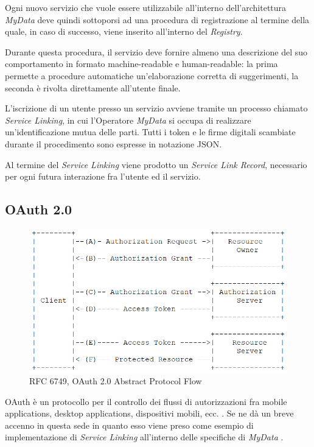 Ogni nuovo servizio che vuole essere utilizzabile all’interno dell’architettura \textit{MyData} deve quindi sottoporsi ad una procedura di registrazione al termine della quale, in caso di successo, viene inserito all’interno del \textit{Registry}.

Durante questa procedura, il servizio deve fornire almeno una descrizione del suo comportamento in formato machine-readable e human-readable: la prima permette a procedure automatiche un'elaborazione corretta di suggerimenti, la seconda \`e rivolta direttamente all’utente finale.

L’iscrizione di un utente presso un servizio avviene tramite un processo chiamato \textit{Service Linking}, in cui l’Operatore \textit{MyData} si occupa di realizzare un'identificazione mutua delle parti. Tutti i token e le firme digitali scambiate durante il procedimento sono espresse in notazione JSON.

Al termine del \textit{Service Linking} viene prodotto un \textit{Service Link Record}, necessario per ogni futura interazione fra l’utente ed il servizio.

\subsection{OAuth 2.0}
\begin{figure} [h]
	\centering
	\includegraphics[width=0.6\linewidth]{pictures/OAuthAbstractProtocolFlow.png}
	\caption{RFC 6749, OAuth 2.0 Abstract Protocol Flow}
	\label{fig:OAuthAbstractProtocolFlow}
\end{figure}
OAuth \`e un protocollo per il controllo dei flussi di autorizzazioni fra mobile applications, desktop applications, dispositivi mobili, ecc. \cite{oauth}. Se ne d\`a un breve accenno in questa sede in quanto esso viene preso come esempio di implementazione di \textit{Service Linking} all’interno delle specifiche di \textit{MyData} \cite{githubmydatastack}.

